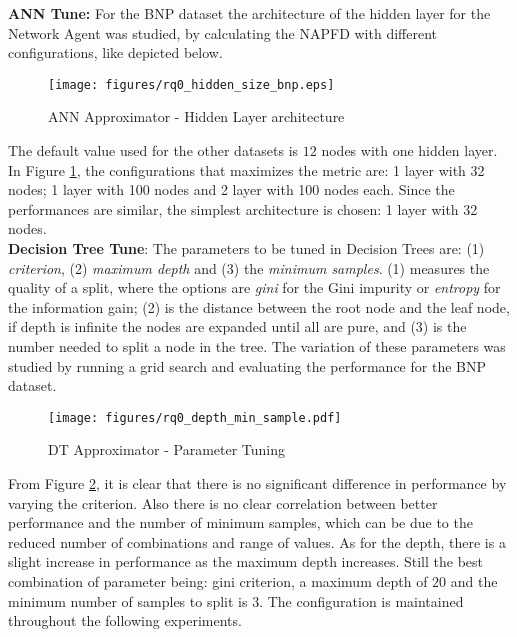\textbf{ANN Tune:} For the BNP dataset the architecture of the hidden layer for the Network Agent was studied, by calculating the NAPFD with different configurations, like depicted below.

\begin{figure}[H]
	\centering
	\texttt{[image: figures/rq0\_hidden\_size\_bnp.eps]}
	\caption{ANN Approximator - Hidden Layer architecture}
	\label{hidden}
\end{figure}

The default value used for the other datasets is $12$ nodes with one hidden layer. In Figure \ref{hidden}, the configurations that maximizes the metric are: 1 layer with 32 nodes; 1 layer with 100 nodes and 2 layer with 100 nodes each. Since the performances are similar, the simplest architecture is chosen: 1 layer with 32 nodes.
\\

\textbf{Decision Tree Tune}: The parameters to be tuned in Decision Trees are: (1) \textit{criterion}, (2) \textit{maximum depth} and (3) the  \textit{minimum samples}. (1) measures the quality of a split, where the options are \textit{gini} for the Gini impurity or \textit{entropy} for the information gain; (2) is the distance between the root node and the leaf node, if depth is infinite the nodes are expanded until all are pure, and (3) is the number needed to split a node in the tree. The variation of these parameters was studied by running a grid search and evaluating the performance for the BNP dataset.
\\

\begin{figure}[htp]
	\centering
	\texttt{[image: figures/rq0\_depth\_min\_sample.pdf]}
	\caption{DT Approximator - Parameter Tuning}
	\label{dtparams}
\end{figure}


From Figure \ref{dtparams}, it is clear that there is no significant difference in performance by varying the criterion. Also there is no clear correlation between better performance and the number of minimum samples, which can be due to the reduced number of combinations and range of values. As for the depth, there is a slight increase in performance as the maximum depth increases. Still the best combination of parameter being: gini criterion, a maximum depth of $20$ and the minimum number of samples to split is $3$. The configuration is maintained throughout the following experiments.
\\

